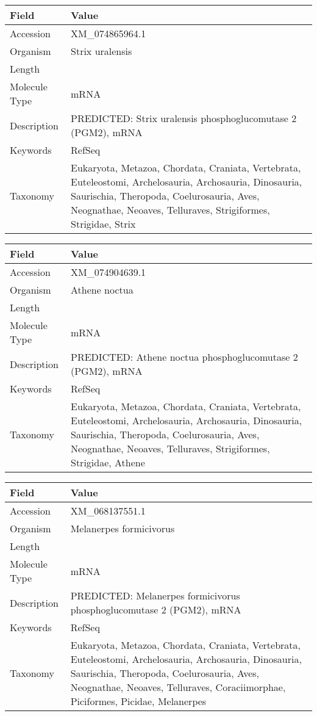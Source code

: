 \documentclass[10pt]{article}
\begin{document}
\vspace{1em}
{\footnotesize
\begin{longtable}{>{\raggedright\arraybackslash}p{4.5cm} >{\raggedright\arraybackslash}p{11.5cm}}
\textbf{Field} & \textbf{Value} \\
\hline
Accession & XM\_074865964.1 \\
Organism & Strix uralensis \\
Length & 2219 \\
Molecule Type & mRNA \\
Description & PREDICTED: Strix uralensis phosphoglucomutase 2 (PGM2), mRNA \\
Keywords & RefSeq \\
Taxonomy & Eukaryota, Metazoa, Chordata, Craniata, Vertebrata, Euteleostomi, Archelosauria, Archosauria, Dinosauria, Saurischia, Theropoda, Coelurosauria, Aves, Neognathae, Neoaves, Telluraves, Strigiformes, Strigidae, Strix \\
\end{longtable}
}

\vspace{1em}
{\footnotesize
\begin{longtable}{>{\raggedright\arraybackslash}p{4.5cm} >{\raggedright\arraybackslash}p{11.5cm}}
\textbf{Field} & \textbf{Value} \\
\hline
Accession & XM\_074904639.1 \\
Organism & Athene noctua \\
Length & 2166 \\
Molecule Type & mRNA \\
Description & PREDICTED: Athene noctua phosphoglucomutase 2 (PGM2), mRNA \\
Keywords & RefSeq \\
Taxonomy & Eukaryota, Metazoa, Chordata, Craniata, Vertebrata, Euteleostomi, Archelosauria, Archosauria, Dinosauria, Saurischia, Theropoda, Coelurosauria, Aves, Neognathae, Neoaves, Telluraves, Strigiformes, Strigidae, Athene \\
\end{longtable}
}

\vspace{1em}
{\footnotesize
\begin{longtable}{>{\raggedright\arraybackslash}p{4.5cm} >{\raggedright\arraybackslash}p{11.5cm}}
\textbf{Field} & \textbf{Value} \\
\hline
Accession & XM\_068137551.1 \\
Organism & Melanerpes formicivorus \\
Length & 2173 \\
Molecule Type & mRNA \\
Description & PREDICTED: Melanerpes formicivorus phosphoglucomutase 2 (PGM2), mRNA \\
Keywords & RefSeq \\
Taxonomy & Eukaryota, Metazoa, Chordata, Craniata, Vertebrata, Euteleostomi, Archelosauria, Archosauria, Dinosauria, Saurischia, Theropoda, Coelurosauria, Aves, Neognathae, Neoaves, Telluraves, Coraciimorphae, Piciformes, Picidae, Melanerpes \\
\end{longtable}
}
\end{document}
